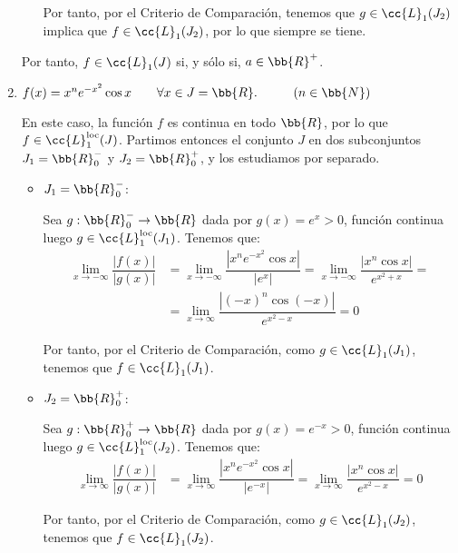 \begin{ejercicio}
\begin{enumerate}
\begin{itemize}
            Por tanto, por el Criterio de Comparación, tenemos que $g\in \cc{L}_1(J_2)$ implica
            que $f\in \cc{L}_1(J_2)$, por lo que siempre se tiene.
        \end{itemize}

        Por tanto, $f\in \cc{L}_1(J)$ si, y sólo si, $a\in \bb{R}^+$.


        \item $f(x)=x^n e^{-x^2}\cos x \qquad \forall x\in J=\bb{R}.\hspace{1cm}(n\in \bb{N})$
        
        En este caso, la función $f$ es continua en todo $\bb{R}$, por lo que $f\in \cc{L}_1^{\text{loc}}(J)$.
        Partimos entonces el conjunto $J$ en dos subconjuntos $J_1=\bb{R}_0^-$ y $J_2=\bb{R}_0^+$, y los estudiamos por separado.
        \begin{itemize}
            \item \ul{$J_1=\bb{R}_0^-$}:
            
            Sea $g:\bb{R}_0^-\to \bb{R}$ dada por $g(x)=e^x>0$, función continua luego $g\in \cc{L}_1^{\text{loc}}(J_1)$.
            Tenemos que:
            \begin{align*}
                \lim_{x\to -\infty} \dfrac{|f(x)|}{|g(x)|} &= \lim_{x\to -\infty} \dfrac{|x^n e^{-x^2}\cos x|}{|e^x|}
                = \lim_{x\to -\infty} \dfrac{|x^n\cos x|}{e^{x^2+x}}
                =\\&= \lim_{x\to \infty} \dfrac{|(-x)^n\cos(-x)|}{e^{x^2-x}}
                = 0
            \end{align*}

            Por tanto, por el Criterio de Comparación, como $g\in \cc{L}_1(J_1)$, tenemos que $f\in \cc{L}_1(J_1)$.
            
            \item \ul{$J_2=\bb{R}_0^+$}:
            
            Sea $g:\bb{R}_0^+\to \bb{R}$ dada por $g(x)=e^{-x}>0$, función continua luego $g\in \cc{L}_1^{\text{loc}}(J_2)$.
            Tenemos que:
            \begin{align*}
                \lim_{x\to \infty} \dfrac{|f(x)|}{|g(x)|}
                &= \lim_{x\to \infty} \dfrac{|x^n e^{-x^2}\cos x|}{|e^{-x}|}
                = \lim_{x\to \infty} \dfrac{|x^n\cos x|}{e^{x^2-x}}
                = 0
            \end{align*}

            Por tanto, por el Criterio de Comparación, como $g\in \cc{L}_1(J_2)$, tenemos que $f\in \cc{L}_1(J_2)$.
        \end{itemize}


\end{enumerate}
\end{ejercicio}
